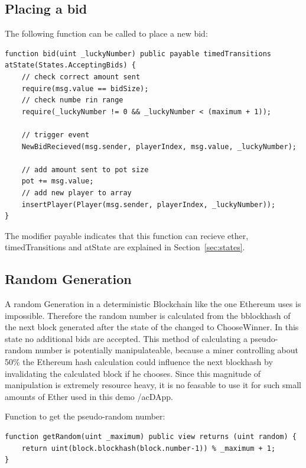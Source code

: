 \subsection{Placing a bid}\label{sec:bet}

The following function can be called to place a new bid:

\begin{lstlisting}[language=Solidity]
function bid(uint _luckyNumber) public payable timedTransitions atState(States.AcceptingBids) {
    // check correct amount sent
    require(msg.value == bidSize);
    // check numbe rin range
    require(_luckyNumber != 0 && _luckyNumber < (maximum + 1)); 

    // trigger event
    NewBidRecieved(msg.sender, playerIndex, msg.value, _luckyNumber);

    // add amount sent to pot size
    pot += msg.value;
    // add new player to array
    insertPlayer(Player(msg.sender, playerIndex, _luckyNumber));
}
\end{lstlisting}

The modifier payable indicates that this function can recieve ether, timedTransitions and atState are explained in Section~\ref{sec:states}.


\subsection{Random Generation}\label{sec:random}

A random Generation in a deterministic Blockchain like the one Ethereum uses is impossible. Therefore the random number is calculated from the bblockhash of the next block generated after the state of the changed to ChooseWinner. In this state no additional bids are accepted. This method of calculating a pseudo-random number is potentially manipulateable, because a miner controlling about 50\% the Ethereum hash calculation could influence the next blockhash by invalidating the calculated block if he chooses. Since this magnitude of manipulation is extremely resource heavy, it is no feasable to use it for such small amounts of Ether used in this demo /ac{DApp}.

Function to get the pseudo-random number:
\begin{lstlisting}[language=Solidity]
function getRandom(uint _maximum) public view returns (uint random) {
    return uint(block.blockhash(block.number-1)) % _maximum + 1;
}
\end{lstlisting}

